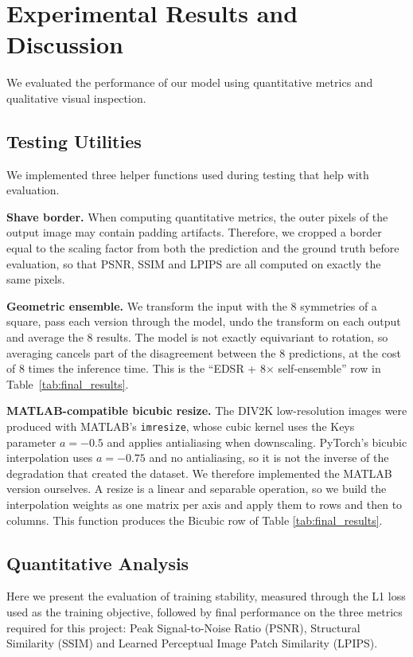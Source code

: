 \documentclass[a4paper,11pt]{article}
\begin{document}
\section{Experimental Results and Discussion}

We evaluated the performance of our model using quantitative metrics and qualitative visual inspection.

\subsection{Testing Utilities}

We implemented three helper functions used during testing that help with evaluation.

\medskip


\textbf{Shave border.} When computing quantitative metrics, the outer pixels of the
output image may contain padding artifacts. Therefore, we cropped a border equal to the
scaling factor from both the prediction and the ground truth before evaluation, so that
PSNR, SSIM and LPIPS are all computed on exactly the same pixels.

\medskip


\textbf{Geometric ensemble.} We transform the input with the 8 symmetries of a square, pass each
version through the model, undo the transform on each output and average the 8 results. The model
is not exactly equivariant to rotation, so averaging cancels part of the disagreement between the
8 predictions, at the cost of 8 times the inference time. This is the
``EDSR + 8$\times$ self-ensemble'' row in Table~\ref{tab:final_results}.


\textbf{MATLAB-compatible bicubic resize.} The DIV2K low-resolution images were produced with
MATLAB's \texttt{imresize}, whose cubic kernel uses the Keys parameter $a=-0.5$ and applies
antialiasing when downscaling. PyTorch's bicubic interpolation uses $a=-0.75$ and no antialiasing, so
it is not the inverse of the degradation that created the dataset. We therefore implemented the
MATLAB version ourselves. A resize is a linear and separable operation, so we build the interpolation
weights as one matrix per axis and apply them to rows and then to columns. This function produces the
Bicubic row of Table \ref{tab:final_results}.

\subsection{Quantitative Analysis}
Here we present the evaluation of training stability, measured through the L1 loss used as the
training objective, followed by final performance on the three metrics required for this project:
Peak Signal-to-Noise Ratio (PSNR), Structural Similarity (SSIM) and Learned Perceptual Image Patch
Similarity (LPIPS).
\end{document}
